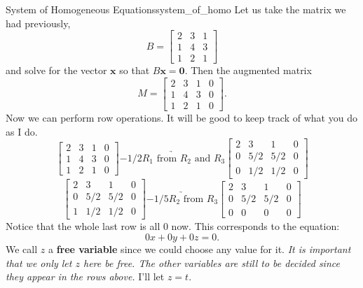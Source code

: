         \begin{ex}{System of Homogeneous Equations}{system_of_homo}
        Let us take the matrix we had previously,
        \[
        B=\begin{bmatrix}
        2 & 3 & 1\\
        1 & 4 & 3\\
        1 & 2 & 1
        \end{bmatrix}
        \]
        and solve for the vector $\mathbf{x}$ so that $B\mathbf{x}=\mathbf{0}$. Then the augmented matrix
        \[
        M=\left[\begin{array}{ccc|c}
        2 & 3 & 1  &  0 \\
        1 & 4 & 3 & 0\\
        1 & 2 & 1 & 0
        \end{array}\right].
        \]
        Now we can perform row operations.  It will be good to keep track of what you do as I do.
        \[
        \left[\begin{array}{ccc|c}
        2 & 3 & 1  &  0 \\
        1 & 4 & 3 & 0\\
        1 & 2 & 1 & 0
        \end{array}\right] \underrightarrow{-1/2 R_1 \textrm{ from } R_2 \textrm{ and } R_3} 
        \left[\begin{array}{ccc|c}
        2 & 3 & 1  &  0 \\
        0 & 5/2 & 5/2 & 0\\
        0 & 1/2 & 1/2 & 0
        \end{array}\right]
        \]
        \[
        \left[\begin{array}{ccc|c}
        2 & 3 & 1  &  0 \\
        0 & 5/2 & 5/2 & 0\\
        1 & 1/2 & 1/2 & 0
        \end{array}\right] \underrightarrow{-1/5 R_2 \textrm{ from } R_3} 
        \left[\begin{array}{ccc|c}
        2 & 3 & 1  &  0 \\
        0 & 5/2 & 5/2 & 0\\
        0 & 0 & 0 & 0
        \end{array}\right]
        \]
        Notice that the whole last row is all $0$ now.  This corresponds to the equation:
        \[
        0x+0y+0z=0.
        \]
        We call $z$ a \textbf{free variable} since we could choose any value for it.  \emph{It is important that we only let $z$ here be free.  The other variables are still to be decided since they appear in the rows above.}  I'll let $z=t.$  
        

\end{ex}

